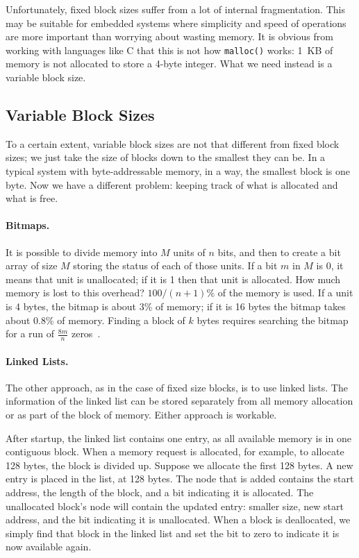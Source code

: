 Unfortunately, fixed block sizes suffer from a lot of internal fragmentation. This may be suitable for embedded systems where simplicity and speed of operations are more important than worrying about wasting memory. It is obvious from working with languages like C that this is not how \texttt{malloc()} works: 1~KB of memory is not allocated to store a 4-byte integer. What we need instead is a variable block size.

\subsection*{Variable Block Sizes}
To a certain extent, variable block sizes are not that different from fixed block sizes; we just take the size of blocks down to the smallest they can be. In a typical system with byte-addressable memory, in a way, the smallest block is one byte. Now we have a different problem: keeping track of what is allocated and what is free.

\paragraph{Bitmaps.} It is possible to divide memory into $M$ units of $n$ bits, and then to create a bit array of size $M$ storing the status of each of those units. If a bit $m$ in $M$ is 0, it means that unit is unallocated; if it is 1 then that unit is allocated. How much memory is lost to this overhead? $100/(n+1)$\% of the memory is used. If a unit is 4 bytes, the bitmap is about 3\% of memory; if it is 16 bytes the bitmap takes about 0.8\% of memory. Finding a block of $k$ bytes requires searching the bitmap for a run of $\frac{8m}{n}$ zeros~\cite{mte241}.

\paragraph{Linked Lists.}
The other approach, as in the case of fixed size blocks, is to use linked lists. The information of the linked list can be stored separately from all memory allocation or as part of the block of memory. Either approach is workable.

After startup, the linked list contains one entry, as all available memory is in one contiguous block. When a memory request is allocated, for example, to allocate 128 bytes, the block is divided up. Suppose we allocate the first 128 bytes. A new entry is placed in the list, at 128 bytes. The node that is added contains the start address, the length of the block, and a bit indicating it is allocated. The unallocated block's node will contain the updated entry: smaller size, new start address, and the bit indicating it is unallocated. When a block is deallocated, we simply find that block in the linked list and set the bit to zero to indicate it is now available again.

